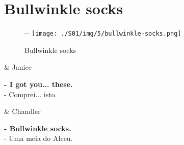 \hypertarget{bullwinkle-socks}{%
\section{Bullwinkle socks}\label{bullwinkle-socks}}

\begin{figure}[!ht]
  \begin{adjustwidth}{-\oddsidemargin-1in}{-\rightmargin}
    \centering
    \texttt{[image: ./S01/img/5/bullwinkle-socks.png]}
    \caption{Bullwinkle socks\label{fig:bullwinkle-socks}}
  \end{adjustwidth}
\end{figure}

\begin{tcolorbox}[enhanced,center upper,
    drop fuzzy shadow southeast, boxrule=0.3pt,
    lower separated=false,
    colframe=black!30!dialogoBorder,colback=white]
\begin{minipage}[c]{0.14\linewidth}
   & \centering \scriptsize{Janice}
\end{minipage}
\hspace{.1mm}
\begin{minipage}[c]{0.8\linewidth}
  \textbf{- I got you... these.}\\
  - Comprei... isto.
\end{minipage}

\medskip
\begin{minipage}[c]{0.14\linewidth}
   & \centering \scriptsize{Chandler}
\end{minipage}
\hspace{.1mm}
\begin{minipage}[c]{0.8\linewidth}
  \textbf{- Bullwinkle socks.}\\
  - Uma meia do Alceu.
\end{minipage}
\end{tcolorbox}

